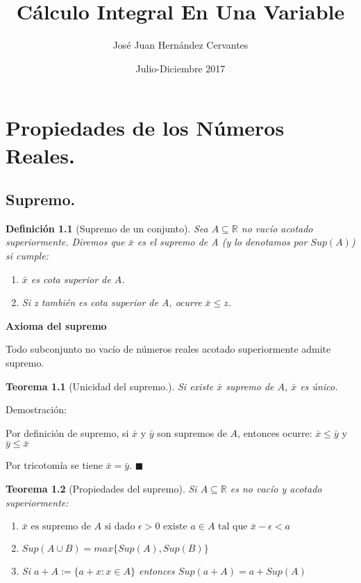 \documentclass[12pt]{book}
\title{Cálculo Integral En Una Variable}
\author{José Juan Hernández Cervantes}
\date{Julio-Diciembre 2017}
\newcommand\R{{\mathbb R}}
\newtheorem{teo}{Teorema}[section]
\newtheorem{defi}{Definición}[section]
\begin{document}
\maketitle
\tableofcontents
\chapter{Propiedades de los Números Reales.}
\section{Supremo.}
\begin{defi}[Supremo de un conjunto]\rm
Sea $A \subseteq \R$  no vacío acotado superiormente.
Diremos que $\bar{x}$ es el supremo de \textit{A} (y lo denotamos por $Sup(A)$) si cumple:
\begin{enumerate}[1.]
\item $\bar{x}$  es cota superior de $A$.
\item Si \textit{z} también es cota superior de \textit{A}, ocurre $\bar{x}\le z$.
\end{enumerate}
\end{defi}

\textbf{Axioma del supremo}

Todo subconjunto no vacío de números reales acotado superiormente admite supremo.

\begin{teo}[Unicidad del supremo.]\rm
Si existe $\bar{x}$ supremo de $A$, $\bar{x}$ es único.
\end{teo}

Demostración:

Por definición de supremo, si $\bar{x}$ y $\bar{y}$ son supremos de $A$, entonces ocurre:
$\bar{x}\le\bar{y}$ y $\bar{y}\le\bar{x}$

Por tricotomía se tiene $\bar{x}=\bar{y}$. $\blacksquare$

\begin{teo}[Propiedades del supremo]\rm
Si $A\subseteq{\R}$ es no vacío y acotado superiormente:


\begin{enumerate}
    \item $\bar{x} \mbox{ es supremo de } A \mbox{ si dado } \epsilon >0 \mbox{ existe } a\in A \mbox{ tal que } \bar{x}-\epsilon < a$
    \item $Sup(A \cup B)=max\{ Sup(A),Sup(B) \}$
    \item Si $a+A:=\{a+x : x \in A \}$ entonces $Sup(a+A)=a+Sup(A)$
\end{enumerate}
\end{teo}
\end{document}
